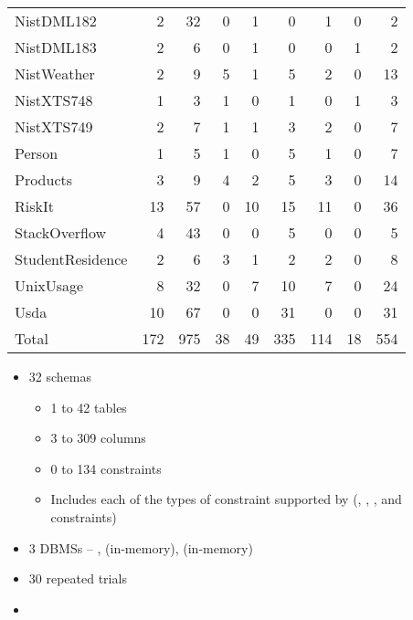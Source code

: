 \begin{table}[t!]
{\begin{tabular}{l@{\hskip -5pt}rrrrrrrr}
				NistDML182 & 2 & 32 & 0 & 1 & 0 & 1 & 0 & 2 \\
				NistDML183 & 2 & 6 & 0 & 1 & 0 & 0 & 1 & 2 \\
				NistWeather & 2 & 9 & 5 & 1 & 5 & 2 & 0 & 13 \\
				NistXTS748 & 1 & 3 & 1 & 0 & 1 & 0 & 1 & 3 \\
				NistXTS749 & 2 & 7 & 1 & 1 & 3 & 2 & 0 & 7 \\
				Person & 1 & 5 & 1 & 0 & 5 & 1 & 0 & 7 \\
				Products & 3 & 9 & 4 & 2 & 5 & 3 & 0 & 14 \\
				RiskIt & 13 & 57 & 0 & 10 & 15 & 11 & 0 & 36 \\
				StackOverflow & 4 & 43 & 0 & 0 & 5 & 0 & 0 & 5 \\
				StudentResidence & 2 & 6 & 3 & 1 & 2 & 2 & 0 & 8 \\
				UnixUsage & 8 & 32 & 0 & 7 & 10 & 7 & 0 & 24 \\
				Usda & 10 & 67 & 0 & 0 & 31 & 0 & 0 & 31 \\
				\hline
				{Total} & 172 & 975 & 38 & 49 & 335 & 114 & 18 & 554 \\
				\hline

			\end{tabular}
		}
	\end{table}

	\begin{itemize}
		\item 32 schemas
		\begin{itemize}
			\item 1 to 42 tables
			\item 3 to 309 columns
			\item 0 to 134 constraints
			\item Includes each of the types of constraint supported by \SchemaAnalyst (\PK, \FK, \NOTNULL, \UNIQUE and \CHECK constraints)
		\end{itemize}
		\item 3 DBMSs -- \Postgres, \HyperSQL (in-memory), \SQLite (in-memory)
		\item 30 repeated trials
		\item {} \\

	\end{itemize}
